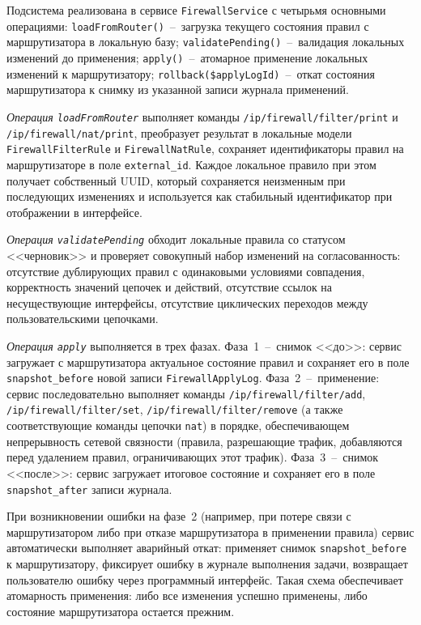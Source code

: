 Подсистема реализована в сервисе \texttt{FirewallService} с четырьмя основными операциями: \texttt{loadFromRouter()}~--~загрузка текущего состояния правил с маршрутизатора в локальную базу; \texttt{validatePending()}~--~валидация локальных изменений до применения; \texttt{apply()}~--~атомарное применение локальных изменений к маршрутизатору; \texttt{rollback(\$applyLogId)}~--~откат состояния маршрутизатора к снимку из указанной записи журнала применений.

\emph{Операция \texttt{loadFromRouter}} выполняет команды \texttt{/ip/firewall/filter/print} и \texttt{/ip/firewall/nat/print}, преобразует результат в локальные модели \texttt{FirewallFilterRule} и \texttt{FirewallNatRule}, сохраняет идентификаторы правил на маршрутизаторе в поле \texttt{external\_id}. Каждое локальное правило при этом получает собственный UUID, который сохраняется неизменным при последующих изменениях и используется как стабильный идентификатор при отображении в интерфейсе.

\emph{Операция \texttt{validatePending}} обходит локальные правила со статусом <<черновик>> и проверяет совокупный набор изменений на согласованность: отсутствие дублирующих правил с одинаковыми условиями совпадения, корректность значений цепочек и действий, отсутствие ссылок на несуществующие интерфейсы, отсутствие циклических переходов между пользовательскими цепочками.

\emph{Операция \texttt{apply}} выполняется в трех фазах. Фаза~1~--~снимок <<до>>: сервис загружает с маршрутизатора актуальное состояние правил и сохраняет его в поле \texttt{snapshot\_before} новой записи \texttt{FirewallApplyLog}. Фаза~2~--~применение: сервис последовательно выполняет команды \texttt{/ip/firewall/filter/add}, \texttt{/ip/firewall/filter/set}, \texttt{/ip/firewall/filter/remove} (а также соответствующие команды цепочки \texttt{nat}) в порядке, обеспечивающем непрерывность сетевой связности (правила, разрешающие трафик, добавляются перед удалением правил, ограничивающих этот трафик). Фаза~3~--~снимок <<после>>: сервис загружает итоговое состояние и сохраняет его в поле \texttt{snapshot\_after} записи журнала.

При возникновении ошибки на фазе~2 (например, при потере связи с маршрутизатором либо при отказе маршрутизатора в применении правила) сервис автоматически выполняет аварийный откат: применяет снимок \texttt{snapshot\_before} к маршрутизатору, фиксирует ошибку в журнале выполнения задачи, возвращает пользователю ошибку через программный интерфейс. Такая схема обеспечивает атомарность применения: либо все изменения успешно применены, либо состояние маршрутизатора остается прежним.

